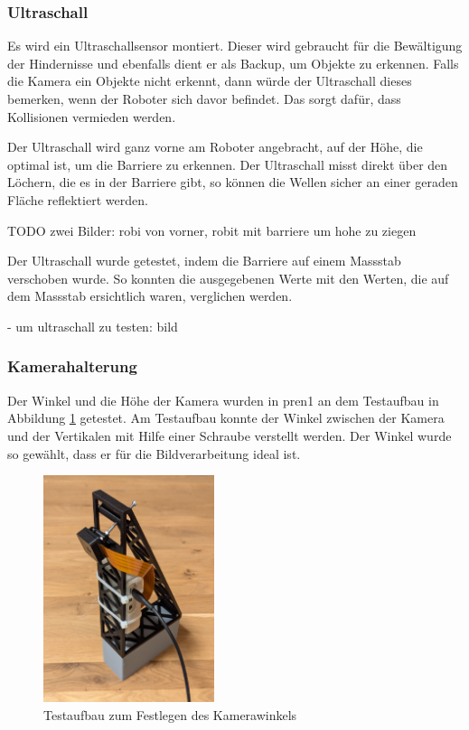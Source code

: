 \subsubsection{Ultraschall}

Es wird ein Ultraschallsensor montiert. Dieser wird gebraucht für die Bewältigung der Hindernisse und ebenfalls dient er als Backup, um Objekte zu erkennen. Falls die Kamera ein Objekte nicht erkennt, dann würde der Ultraschall dieses bemerken, wenn der Roboter sich davor befindet. Das sorgt dafür, dass Kollisionen vermieden werden.

Der Ultraschall wird ganz vorne am Roboter angebracht, auf der Höhe, die optimal ist, um die Barriere zu erkennen. Der Ultraschall misst direkt über den Löchern, die es in der Barriere gibt, so können die Wellen sicher an einer geraden Fläche reflektiert werden.

TODO zwei Bilder: robi von vorner, robit mit barriere um hohe zu ziegen

Der Ultraschall wurde getestet, indem die Barriere auf einem Massstab verschoben wurde. So konnten die ausgegebenen Werte mit den Werten, die auf dem Massstab ersichtlich waren, verglichen werden.

- um ultraschall zu testen: bild

\subsubsection{Kamerahalterung}
\label{Kamera Halter}

Der Winkel und die Höhe der Kamera wurden in \acrshort{pren1} an dem Testaufbau in Abbildung \ref{fig:Testaufbau zum Festlegen des Kamerawinkels} getestet. Am Testaufbau konnte der Winkel zwischen der Kamera und der Vertikalen mit Hilfe einer Schraube verstellt werden. Der Winkel wurde so gewählt, dass er für die Bildverarbeitung ideal ist. 

\begin{figure}[H]
\centering
\includegraphics[width=5cm]{assets/MT/camer_tower_2.png}
\caption{Testaufbau zum Festlegen des Kamerawinkels}
\label{fig:Testaufbau zum Festlegen des Kamerawinkels}
\end{figure}


